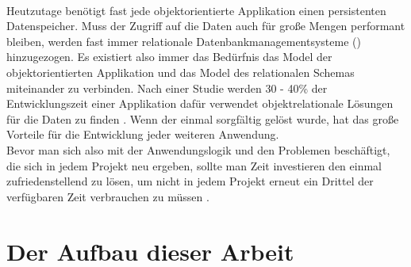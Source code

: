 \\
Heutzutage benötigt fast jede objektorientierte Applikation einen persistenten Datenspeicher. Muss der Zugriff auf die Daten auch für große Mengen performant bleiben, werden fast immer relationale Datenbankmanagementsysteme (\RDBMS) hinzugezogen. Es existiert also immer das Bedürfnis das Model der objektorientierten Applikation und das Model des relationalen Schemas miteinander zu verbinden. Nach einer Studie werden 30 - 40\% der Entwicklungszeit einer Applikation dafür verwendet objektrelationale Lösungen für die Daten zu finden \cite{Keene04dataservices}. Wenn der \IM einmal sorgfältig gelöst wurde, hat das große Vorteile für die Entwicklung jeder weiteren Anwendung.\\
Bevor man sich also mit der Anwendungslogik und den Problemen beschäftigt, die sich in jedem Projekt neu ergeben, sollte man Zeit investieren den \IM einmal zufriedenstellend zu lösen, um nicht in jedem Projekt erneut ein Drittel der verfügbaren Zeit verbrauchen zu müssen \cite{Neward06thevietnam}.\\

\section{Der Aufbau dieser Arbeit}

